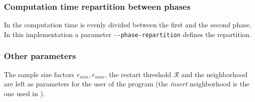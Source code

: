 \subsubsection{Computation time repartition between phases}

In \cite{santostabu} the computation time is evenly divided between the first and the second phase. In this implementation a parameter \verb!--phase-repartition! defines the repartition.

\subsubsection{Other parameters}

The sample size factors $r_{min}, r_{max}$, the restart threshold $\mathcal{R}$ and the neighborhood are left as parameters for the user of the program (the \emph{insert} neighborhood is the one used in \cite{santostabu}).
